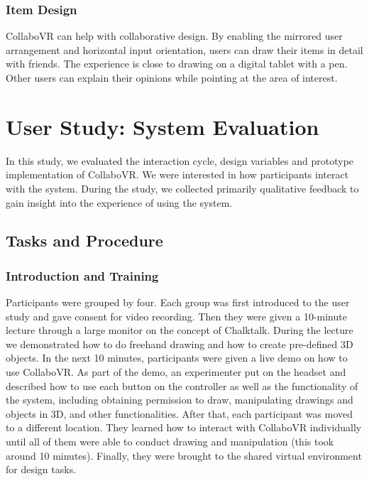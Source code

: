 \documentclass{sigchi}
\begin{document}
\subsubsection{Item Design}
CollaboVR can help with collaborative design. By enabling the mirrored user arrangement and horizontal input orientation, users can draw their items in detail with friends. The experience is close to drawing on a digital tablet with a pen. Other users can explain their opinions while pointing at the area of interest.

\section{User Study: System Evaluation}

In this study, we evaluated the interaction cycle, design variables and prototype implementation of CollaboVR. We were interested in how participants interact with the system. During the study, we collected primarily qualitative feedback to gain insight into the experience of using the system.

\subsection{Tasks and Procedure}
\subsubsection{Introduction and Training}
Participants were grouped by four. Each group was first introduced to the user study and gave consent for video recording. Then they were given a 10-minute lecture through a large monitor on the concept of Chalktalk. During the lecture we demonstrated how to do freehand drawing and how to create pre-defined 3D objects.
In the next 10 minutes, participants were given a live demo on how to use CollaboVR. As part of the demo, an experimenter put on the headset and described how to use each button on the controller as well as the functionality of the system, including obtaining permission to draw, manipulating drawings and objects in 3D, and other functionalities.
After that, each participant was moved to a different location. They learned how to interact with CollaboVR individually until all of them were able to conduct drawing and manipulation (this took around 10 minutes). Finally, they were brought to the shared virtual environment for design tasks. 
\end{document}
